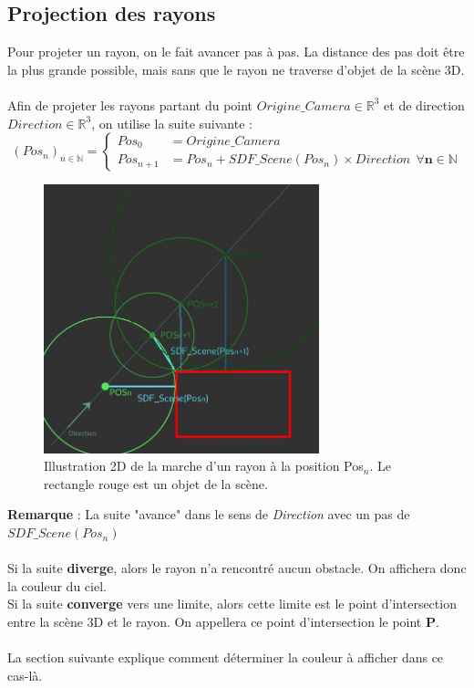 \newpage
\subsection{Projection des rayons}
\label{subsec:projection}
Pour projeter un rayon, on le fait avancer pas à pas. La distance des pas doit être la plus grande possible, mais sans que le rayon ne traverse d'objet de la scène 3D.\\
\\
Afin de projeter les rayons partant du point $Origine\_Camera\in \mathbb{R}^3$ et de direction $Direction\in \mathbb{R}^3$, on utilise la suite suivante :
$$
(Pos_n)_{n\in \mathbb{N}}=\left\{
    \begin{array}{ll}
        Pos_0 &= Origine\_Camera \\
        Pos_{n+1} &= Pos_n + SDF\_Scene(Pos_n)\times Direction \ \ \mathbf{\forall n\in \mathbb{N}}
    \end{array}
\right.
$$

\begin{figure}[h]
    \centering
    \includegraphics[width=8cm]{images/ProjectionDesRayons.jpg}
    \caption{Illustration 2D de la marche d'un rayon à la position Pos$_n$. Le rectangle rouge est un objet de la scène.}
    \label{fig:projectionrayons}
\end{figure}

\textbf{Remarque} : La suite "avance" dans le sens de \emph{Direction} avec un pas de $SDF\_Scene(Pos_n)$\\
\\
Si la suite \textbf{diverge}, alors le rayon n'a rencontré aucun obstacle. On affichera donc la couleur du ciel.\\
Si la suite \textbf{converge} vers une limite, alors cette limite est le point d'intersection entre la scène 3D et le rayon. On appellera ce point d'intersection le point \textbf{P}.\\
\\
La section suivante explique comment déterminer la couleur à afficher dans ce cas-là.